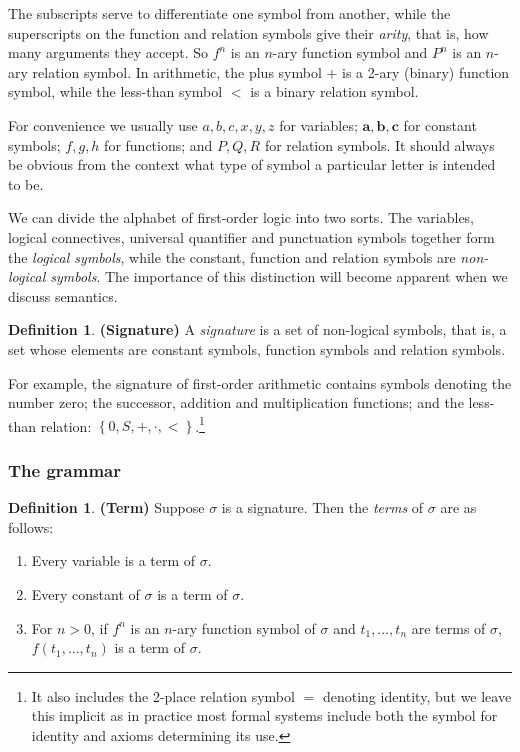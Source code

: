 \documentclass[10pt, a4paper, oneside]{article}
\theoremstyle{definition}
\newtheorem{dfn}[thm]{Definition}
\theoremstyle{remark}
\theoremstyle{plain}
\begin{document}
The subscripts serve to differentiate one symbol from another, while the
superscripts on the function and relation symbols give their \emph{arity}, that
is, how many arguments they accept. So $f^n$ is an $n$-ary function symbol and
$P^n$ is an $n$-ary relation symbol. In arithmetic, the plus symbol $+$ is a
2-ary (binary) function symbol, while the less-than symbol $<$ is a binary
relation symbol.

For convenience we usually use $a, b, c, x, y, z$ for variables; $\mathbf{a},
\mathbf{b}, \mathbf{c}$ for constant symbols; $f, g, h$ for functions; and $P,
Q, R$ for relation symbols. It should always be obvious from the context what
type of symbol a particular letter is intended to be.

We can divide the alphabet of first-order logic into two sorts. The variables,
logical connectives, universal quantifier and punctuation symbols together form
the \emph{logical symbols}, while the constant, function and relation symbols
are \emph{non-logical symbols}. The importance of this distinction will become
apparent when we discuss semantics.

\begin{dfn}
    \textbf{(Signature)}
    A \emph{signature} is a set of non-logical symbols, that is, a set whose
    elements are constant symbols, function symbols and relation symbols.
\end{dfn}

For example, the signature of first-order arithmetic contains symbols denoting
the number zero; the successor, addition and multiplication functions; and the
less-than relation: $\left\{ 0, S, +, \cdot, < \right\}$.\footnote{It also
includes the 2-place relation symbol $=$ denoting identity, but we leave this
implicit as in practice most formal systems include both the symbol for identity
and axioms determining its use.}

\subsubsection{The grammar}

\begin{dfn}
    \textbf{(Term)}
    Suppose $\sigma$ is a signature. Then the \emph{terms} of $\sigma$ are as
    follows:
    
    \begin{enumerate}
        \item Every variable is a term of $\sigma$.
        \item Every constant of $\sigma$ is a term of $\sigma$.
        \item For $n > 0$, if $f^n$ is an $n$-ary function symbol of $\sigma$
            and $t_1, \dotsc, t_n$ are terms of $\sigma$, $f(t_1, \dotsc, t_n)$
            is a term of $\sigma$.
    \end{enumerate}
\end{dfn}
\end{document}
